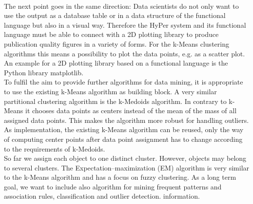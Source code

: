 \\
The next point goes in the same direction: Data scientists do not only want to use the output as a database table or in a data structure of the functional language but also in a visual way. Therefore the HyPer system and its functional language must be able to connect with a 2D plotting library to produce publication quality figures in a variety of forms. For the k-Means clustering algorithms this means a possibility to plot the data points, e.g. as a scatter plot. An example for a 2D plotting library based on a functional language is the Python library matplotlib. 
\\
To fulfil the aim to provide further algorithms for data mining, it is appropriate to use the existing k-Means algorithm as building block. A very similar partitional clustering algorithm is the k-Medoids algorithm. In contrary to k-Means it chooses data points as centers instead of the mean of the mass of all assigned data points. This makes the algorithm more robust for handling outliers. As implementation, the existing k-Means algorithm can be reused, only the way of computing center points after data point assignment has to change according to the requirements of k-Medoids. 
\\
So far we assign each object to one distinct cluster. However, objects may belong to several clusters. The Expectation–maximization (EM) algorithm is very similar to the k-Means algorithm and has a focus on fuzzy clustering. As a long term goal, we want to include also algorithm for mining frequent patterns and association rules, classification and outlier detection. 
information.










